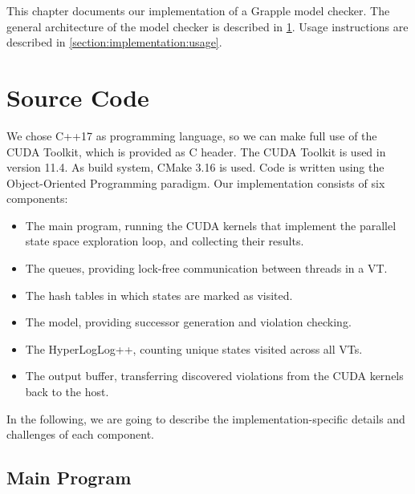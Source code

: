 \documentclass[
fancyheadings, %
%
%
]{stsreprt}
\begin{document}
This chapter documents our implementation of a Grapple model checker.
The general architecture of the model checker is described in \cref{section:implementation:source-code}.
Usage instructions are described in \cref{section:implementation:usage}.

\section{Source Code}
\label{section:implementation:source-code}

We chose C++17 as programming language, so we can make full use of the CUDA Toolkit, which is provided as C header.
The CUDA Toolkit is used in version 11.4.
As build system, CMake 3.16 is used.
Code is written using the Object-Oriented Programming paradigm.
Our implementation consists of six components:

\begin{itemize}
    \item The main program, running the CUDA kernels that implement the parallel state space exploration loop, and collecting their results.
    \item The queues, providing lock-free communication between threads in a VT.
    \item The hash tables in which states are marked as visited.
    \item The model, providing successor generation and violation checking.
    \item The HyperLogLog++, counting unique states visited across all VTs.
    \item The output buffer, transferring discovered violations from the CUDA kernels back to the host.
\end{itemize}


In the following, we are going to describe the implementation-specific details and challenges of each component.

\subsection{Main Program}
\end{document}
